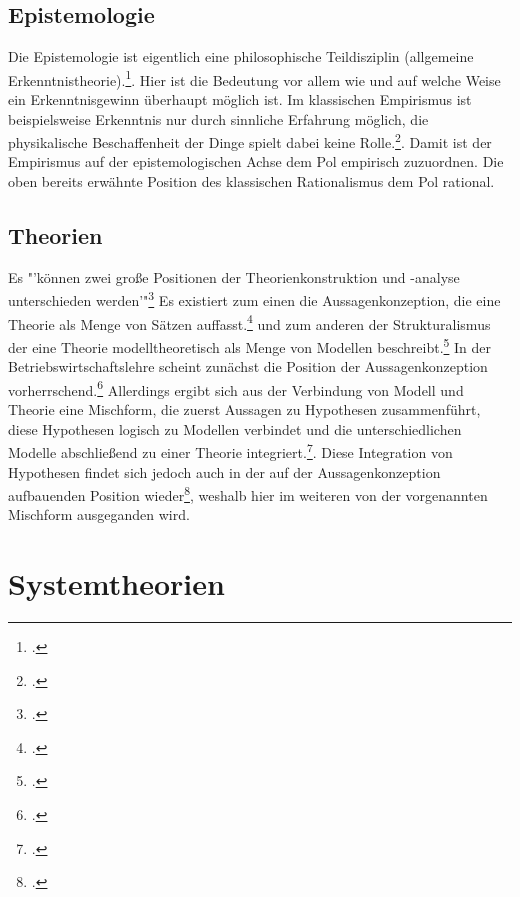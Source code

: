 \documentclass[a4paper,12pt]{article}
\begin{document}
\subsection{Epistemologie}
Die Epistemologie ist eigentlich eine philosophische Teildisziplin (allgemeine Erkenntnistheorie).\footcite[S. 1]{Helfrich2024}. Hier ist die Bedeutung vor allem wie und auf welche Weise ein Erkenntnisgewinn überhaupt möglich ist. Im klassischen Empirismus ist beispielsweise Erkenntnis nur durch sinnliche Erfahrung möglich, die physikalische Beschaffenheit der Dinge spielt dabei keine Rolle.\footcite[S. 98]{Helfrich2024}. Damit ist der Empirismus auf der epistemologischen Achse dem Pol empirisch zuzuordnen. Die oben bereits erwähnte Position des klassischen Rationalismus dem Pol rational.
\subsection{Theorien}
Es "'können zwei große Positionen der Theorienkonstruktion und -analyse unterschieden werden'"\footcite[S. 100]{Kornmesser2020} Es existiert zum einen die Aussagenkonzeption, die eine Theorie als Menge von Sätzen auffasst.\footcite[S. 100]{Kornmesser2020} und zum anderen der Strukturalismus der eine Theorie modelltheoretisch als Menge von Modellen beschreibt.\footcite[S. 100]{Kornmesser2020} In der Betriebswirtschaftslehre scheint zunächst die Position der Aussagenkonzeption vorherrschend.\footcite[S. 61]{Helfrich2024} Allerdings ergibt sich aus der Verbindung von Modell und Theorie eine Mischform, die zuerst Aussagen zu Hypothesen zusammenführt, diese Hypothesen logisch zu Modellen verbindet und die unterschiedlichen Modelle abschließend zu einer Theorie integriert.\footcite[S. 84]{Kornmeier2007}. Diese Integration von Hypothesen findet sich jedoch auch in der auf der Aussagenkonzeption aufbauenden Position wieder\footcite[S. 63]{Helfrich2024}, weshalb hier im weiteren von der vorgenannten Mischform ausgeganden wird.
\section{Systemtheorien}
\end{document}
